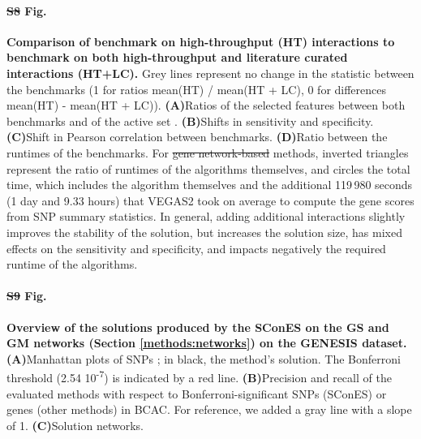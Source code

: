 \documentclass[10pt,letterpaper]{article}
\providecommand{\DIFaddtex}[1]{{\protect\color{blue}\uwave{#1}}} %
\providecommand{\DIFdeltex}[1]{{\protect\color{red}\sout{#1}}}                      %
\providecommand{\DIFaddbegin}{} %
\providecommand{\DIFaddend}{} %
\providecommand{\DIFdelbegin}{} %
\providecommand{\DIFdelend}{} %
\providecommand{\DIFadd}[1]{\texorpdfstring{\DIFaddtex{#1}}{#1}} %
\providecommand{\DIFdel}[1]{\texorpdfstring{\DIFdeltex{#1}}{}} %
\newcommand{\DIFscaledelfig}{0.5}
\newlength{\DIFdelgraphicswidth} %
\newlength{\DIFdelgraphicsheight} %
\newcommand{\DIFaddincludegraphics}[2][]{{\color{blue}\fbox{\DIFOincludegraphics[#1]{#2}}}} %
\newcommand{\DIFdelincludegraphics}[2][]{%
\sbox{\DIFdelgraphicsbox}{\DIFOincludegraphics[#1]{#2}}%
\settoboxwidth{\DIFdelgraphicswidth}{\DIFdelgraphicsbox} %
\settoboxtotalheight{\DIFdelgraphicsheight}{\DIFdelgraphicsbox} %
\scalebox{\DIFscaledelfig}{%
\parbox[b]{\DIFdelgraphicswidth}{\usebox{\DIFdelgraphicsbox}\\[-\baselineskip] \rule{\DIFdelgraphicswidth}{0em}}\llap{\resizebox{\DIFdelgraphicswidth}{\DIFdelgraphicsheight}{%
\setlength{\unitlength}{\DIFdelgraphicswidth}%
\begin{picture}(1,1)%
\thicklines\linethickness{2pt} %
{\color[rgb]{1,0,0}\put(0,0){\framebox(1,1){}}}%
{\color[rgb]{1,0,0}\put(0,0){\line( 1,1){1}}}%
{\color[rgb]{1,0,0}\put(0,1){\line(1,-1){1}}}%
\end{picture}%
}\hspace*{3pt}}} %
} %
\DeclareRobustCommand{\DIFaddbegin}{\DIFOaddbegin \let\includegraphics\DIFaddincludegraphics} %
\DeclareRobustCommand{\DIFaddend}{\DIFOaddend \let\includegraphics\DIFOincludegraphics} %
\DeclareRobustCommand{\DIFdelbegin}{\DIFOdelbegin \let\includegraphics\DIFdelincludegraphics} %
\DeclareRobustCommand{\DIFdelend}{\DIFOaddend \let\includegraphics\DIFOincludegraphics} %
\begin{document}

\paragraph*{\DIFdelbegin \DIFdel{S8 }\DIFdelend \DIFaddbegin \DIFadd{S9 }\DIFaddend Fig.}
\label{sfig:lc_ht_comparison}
{\bf Comparison of \DIFaddbegin \DIFadd{the }\DIFaddend benchmark on high-throughput (HT) interactions to \DIFaddbegin \DIFadd{the }\DIFaddend benchmark on both high-throughput and literature curated interactions (HT+LC). } Grey lines represent no change in the statistic between the benchmarks (1 for ratios mean(HT) / mean(HT + LC), 0 for differences mean(HT) - mean(HT + LC)). \textbf{(A)}\DIFaddbegin \DIFadd{~}\DIFaddend Ratios of the selected features between both benchmarks and of the active set \DIFaddbegin \DIFadd{(Section~\ref{methods:classifier})}\DIFaddend . \textbf{(B)}\DIFaddbegin \DIFadd{~}\DIFaddend Shifts in sensitivity and specificity. \textbf{(C)}\DIFaddbegin \DIFadd{~}\DIFaddend Shift in Pearson correlation between benchmarks. \textbf{(D)}\DIFaddbegin \DIFadd{~}\DIFaddend Ratio between the runtimes of the benchmarks. For \DIFdelbegin \DIFdel{gene network-based }\DIFdelend \DIFaddbegin \DIFadd{gene-based }\DIFaddend methods, inverted triangles represent the ratio of runtimes of the algorithms themselves, and circles the total time, which includes the algorithm themselves and the additional 119\,980 seconds (1 day and 9.33 hours) that VEGAS2 took on average to compute the gene scores from SNP summary statistics. In general, adding additional interactions slightly improves the stability of the solution, but increases the solution size, has mixed effects on the sensitivity and specificity, and impacts negatively the required runtime of the algorithms.
  

\paragraph*{\DIFdelbegin \DIFdel{S9 }\DIFdelend \DIFaddbegin \DIFadd{S10 }\DIFaddend Fig.}
\label{sfig:scones_gsm}
{\bf Overview of the solutions produced by the SConES on the GS and GM networks (Section \ref{methods:networks}) on the GENESIS dataset.} \textbf{(A)}\DIFaddbegin \DIFadd{~}\DIFaddend Manhattan plots of SNPs \DIFaddbegin \DIFadd{(Section \ref{methods:conventional})}\DIFaddend ; in black, the method’s solution. The Bonferroni threshold (2.54 \texttimes{} 10\textsuperscript{-7}) is indicated by a red line. \textbf{(B)}\DIFaddbegin \DIFadd{~}\DIFaddend Precision and recall of the evaluated methods with respect to Bonferroni-significant SNPs (SConES) or genes (other methods) in BCAC. For reference, we added a gray line with a slope of 1. \textbf{(C)}\DIFaddbegin \DIFadd{~}\DIFaddend Solution networks.
\end{document}
